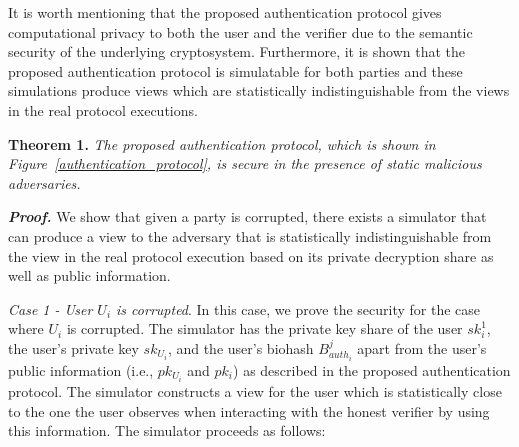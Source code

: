 \documentclass[journal]{IEEEtran}
\begin{document}
It is worth mentioning that the proposed authentication protocol gives computational privacy to both the user and the verifier due to the semantic security of the underlying cryptosystem. Furthermore, it is shown that the proposed authentication protocol is simulatable for both parties and these simulations produce views which are statistically indistinguishable from the views in the real protocol executions.

\textbf{Theorem 1.} \textit{The proposed authentication protocol, which is shown in Figure~\ref{authentication_protocol}, is secure in the presence of static malicious adversaries.}

\textbf{\textit{Proof.}} We show that given a party is corrupted, there exists a simulator that can produce a view to the adversary that is statistically indistinguishable from the view in the real protocol execution based on its private decryption share as well as public information.

{\it Case 1 - User $U_i$ is corrupted}. In this case, we prove the security for the case where $U_i$ is corrupted. The simulator has the private key share of the user $sk_i^1$, the user's private key $sk_{U_i}$, and the user's biohash $B^j_{auth_i}$ apart from the user's public information (i.e., $pk_{U_i}$ and $pk_i$) as described in the proposed authentication protocol. The simulator constructs a view for the user which is statistically close to the one the user observes when interacting with the honest verifier by using this information. The simulator proceeds as follows:
\end{document}

